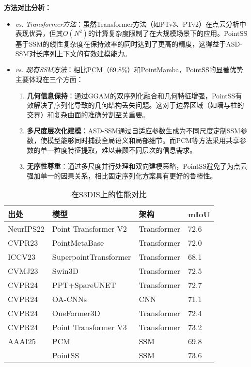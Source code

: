 \documentclass[preprint,12pt]{elsarticle}
\begin{document}
\textbf{方法对比分析：}
\begin{itemize}
	\item \textit{vs. Transformer方法}：虽然Transformer方法（如PTv3、PTv2）在点云分析中表现优异，但其$O(N^2)$的计算复杂度限制了在大规模场景下的应用。PointSS基于SSM的线性复杂度在保持效率的同时达到了更高的精度，这得益于ASD-SSM对长序列上下文的有效建模能力。
	
	\item \textit{vs. 现有SSM方法}：相比PCM（69.8\%）和PointMamba，PointSS的显著优势主要体现在三个方面：
	\begin{enumerate}
		\item \textbf{几何信息保持}：通过GGAM的双序列化融合和几何特征增强，PointSS有效解决了序列化导致的几何结构丢失问题。这对于边界区域（如墙与柱的交界）和复杂曲面的准确分割至关重要。
		\item \textbf{多尺度层次化建模}：ASD-SSM通过自适应参数生成为不同尺度定制SSM参数，使模型能够同时捕获全局语义和局部细节。而PCM等方法采用共享参数的单一粒度特征提取，难以兼顾不同层次的信息需求。
		\item \textbf{无序性尊重}：通过多尺度并行处理和双向建模策略，PointSS避免了为点云强加单一的因果关系，相比固定序列化方案具有更好的鲁棒性。
	\end{enumerate}
\end{itemize}
\begin{table}[htbp!]
	\caption{在S3DIS上的性能对比}
\label{tab:s3dis}
	\begin{tabular}{@{}llll@{}}
		\toprule
		\textbf{出处}  & \textbf{模型}           & \textbf{架构} & \textbf{mIoU} \\ \midrule
		NeurIPS22 & Point Transformer V2\cite{ptv2}  & Transformer & 72.6          \\
		CVPR23     & PointMetaBase\cite{pmb}         & Transformer & 72.0          \\
		ICCV23     & SuperpointTransformer\cite{spt} & Transformer & 68.1          \\
		CVMJ23     & Swin3D\cite{Swin3D}                & Transformer & 72.5          \\
		CVPR24     & PPT+SpareUNET\cite{ppt}         & Transformer & 72.7          \\
		CVPR24     & OA-CNNs\cite{oacnn}               & CNN         & 71.1          \\
		CVPR24     & OneFormer3D\cite{OneFormer3D}           & Transformer & 72.4          \\
		CVPR24     & Point Transformer V3\cite{ptv3}           & Transformer & 73.2          \\
		AAAI25    & PCM\cite{pcm}                   & SSM         & 69.8         \\
		& PointSS               &SSM           & 73.6          \\ \bottomrule
	\end{tabular}
		\centering
	

\end{table}
\end{document}
